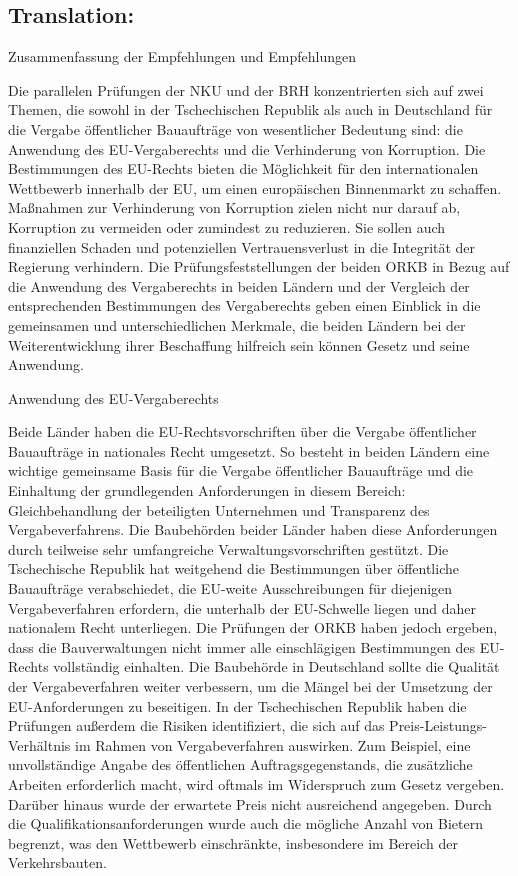 \documentclass[10pt]{article}
\begin{document}
\pagebreak

\subsection*{Translation:}



Zusammenfassung der Empfehlungen und Empfehlungen

Die parallelen Prüfungen der NKU und der BRH konzentrierten sich auf zwei Themen, die sowohl in der Tschechischen Republik als auch in Deutschland für die Vergabe öffentlicher Bauaufträge von wesentlicher Bedeutung sind: die Anwendung des EU-Vergaberechts und die Verhinderung von Korruption.
Die Bestimmungen des EU-Rechts bieten die Möglichkeit für den internationalen Wettbewerb innerhalb der EU, um einen europäischen Binnenmarkt zu schaffen.
Maßnahmen zur Verhinderung von Korruption zielen nicht nur darauf ab, Korruption zu vermeiden oder zumindest zu reduzieren. Sie sollen auch finanziellen Schaden und potenziellen Vertrauensverlust in die Integrität der Regierung verhindern.
Die Prüfungsfeststellungen der beiden ORKB in Bezug auf die Anwendung des Vergaberechts in beiden Ländern und der Vergleich der entsprechenden Bestimmungen des Vergaberechts geben einen Einblick in die gemeinsamen und unterschiedlichen Merkmale, die beiden Ländern bei der Weiterentwicklung ihrer Beschaffung hilfreich sein können Gesetz und seine Anwendung.


Anwendung des EU-Vergaberechts

Beide Länder haben die EU-Rechtsvorschriften über die Vergabe öffentlicher Bauaufträge in nationales Recht umgesetzt.
So besteht in beiden Ländern eine wichtige gemeinsame Basis für die Vergabe öffentlicher Bauaufträge und die Einhaltung der grundlegenden Anforderungen in diesem Bereich: Gleichbehandlung der beteiligten Unternehmen und Transparenz des Vergabeverfahrens.
Die Baubehörden beider Länder haben diese Anforderungen durch teilweise sehr umfangreiche Verwaltungsvorschriften gestützt.
Die Tschechische Republik hat weitgehend die Bestimmungen über öffentliche Bauaufträge verabschiedet, die EU-weite Ausschreibungen für diejenigen Vergabeverfahren erfordern, die unterhalb der EU-Schwelle liegen und daher nationalem Recht unterliegen.
Die Prüfungen der ORKB haben jedoch ergeben, dass die Bauverwaltungen nicht immer alle einschlägigen Bestimmungen des EU-Rechts vollständig einhalten.
Die Baubehörde in Deutschland sollte die Qualität der Vergabeverfahren weiter verbessern, um die Mängel bei der Umsetzung der EU-Anforderungen zu beseitigen.
In der Tschechischen Republik haben die Prüfungen außerdem die Risiken identifiziert, die sich auf das Preis-Leistungs-Verhältnis im Rahmen von Vergabeverfahren auswirken.
Zum Beispiel, eine unvollständige Angabe des öffentlichen Auftragsgegenstands, die zusätzliche Arbeiten erforderlich macht, wird oftmals im Widerspruch zum Gesetz vergeben. Darüber hinaus wurde der erwartete Preis nicht ausreichend angegeben. Durch die Qualifikationsanforderungen wurde auch die mögliche Anzahl von Bietern begrenzt, was den Wettbewerb einschränkte, insbesondere im Bereich der Verkehrsbauten.
\end{document}
